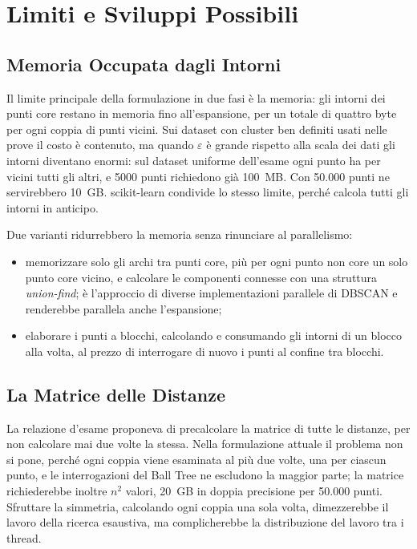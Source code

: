 \chapter{Limiti e Sviluppi Possibili}
\label{cap:limiti}

\section{Memoria Occupata dagli Intorni}

Il limite principale della formulazione in due fasi è la memoria: gli intorni dei punti core restano in memoria fino all'espansione, per un totale di quattro byte per ogni coppia di punti vicini. Sui dataset con cluster ben definiti usati nelle prove il costo è contenuto, ma quando $\varepsilon$ è grande rispetto alla scala dei dati gli intorni diventano enormi: sul dataset uniforme dell'esame ogni punto ha per vicini tutti gli altri, e 5000 punti richiedono già 100~MB. Con 50.000 punti ne servirebbero 10~GB. scikit-learn condivide lo stesso limite, perché calcola tutti gli intorni in anticipo.

Due varianti ridurrebbero la memoria senza rinunciare al parallelismo:

\begin{itemize}
    \item memorizzare solo gli archi tra punti core, più per ogni punto non core un solo punto core vicino, e calcolare le componenti connesse con una struttura \emph{union-find}; è l'approccio di diverse implementazioni parallele di DBSCAN e renderebbe parallela anche l'espansione;
    \item elaborare i punti a blocchi, calcolando e consumando gli intorni di un blocco alla volta, al prezzo di interrogare di nuovo i punti al confine tra blocchi.
\end{itemize}

\section{La Matrice delle Distanze}

La relazione d'esame proponeva di precalcolare la matrice di tutte le distanze, per non calcolare mai due volte la stessa. Nella formulazione attuale il problema non si pone, perché ogni coppia viene esaminata al più due volte, una per ciascun punto, e le interrogazioni del Ball Tree ne escludono la maggior parte; la matrice richiederebbe inoltre $n^2$ valori, 20~GB in doppia precisione per 50.000 punti. Sfruttare la simmetria, calcolando ogni coppia una sola volta, dimezzerebbe il lavoro della ricerca esaustiva, ma complicherebbe la distribuzione del lavoro tra i thread.

